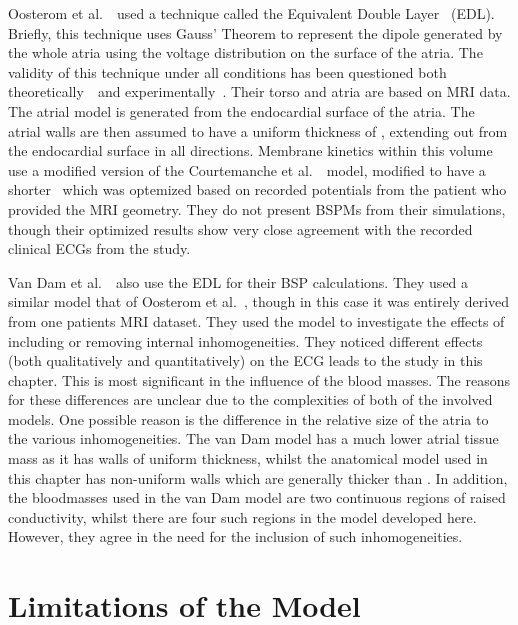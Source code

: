 Oosterom et al.~\cite{Oosterom2005}\ used a technique called the Equivalent
Double Layer~\cite{Huiskamp1988} (EDL).
Briefly, this technique uses Gauss' Theorem to represent the dipole generated by
the whole atria using the voltage distribution on the surface of the atria.
The validity of this technique under all conditions has been questioned both
theoretically~\cite{Geselowitz1992}\ and experimentally~\cite{Scher1994}.
Their torso and atria are based on MRI data.
The atrial model is generated from the endocardial surface of the atria.
The atrial walls are then assumed to have a uniform thickness of ,
extending out from the endocardial surface in all directions.
Membrane kinetics within this volume use a modified version of the Courtemanche
et al.~\cite{CRN98}\ model, modified to have a shorter \apd\ which was
optemized based on recorded potentials from the patient who provided the MRI
geometry.
They do not present BSPMs from their simulations, though their optimized results
show very close agreement with the recorded clinical ECGs from the study.

Van Dam et al.~\cite{vanDam2005}\ also use the EDL for their BSP calculations.
They used a similar model that of Oosterom et al.~\cite{Oosterom2005}, though in
this case it was entirely derived from one patients MRI dataset.
They used the model to investigate the effects of including or removing internal
inhomogeneities.
They noticed different effects (both qualitatively and quantitatively) on the
ECG leads to the study in this chapter.
This is most significant in the influence of the blood masses.
The reasons for these differences are unclear due to the complexities of both of
the involved models.
One possible reason is the difference in the relative size of the atria to the various
inhomogeneities.
The van Dam model has a much lower atrial tissue mass as it has walls of uniform
thickness, whilst the anatomical model used in this chapter has non-uniform
walls which are generally thicker than .
In addition, the bloodmasses used in the van Dam model are two continuous
regions of raised conductivity, whilst there are four such regions in the model
developed here.
However, they agree in the need for the inclusion of such inhomogeneities.

\section{Limitations of the Model}
\label{sec:bsp:limits}

